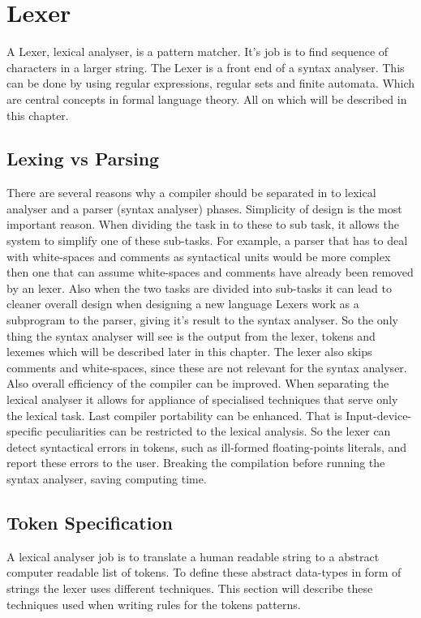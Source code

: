 \chapter{Lexer}
A Lexer, lexical analyser, is a pattern matcher. It's job is to find sequence 
of characters in a larger string. The Lexer is a front end of a syntax 
analyser. \cite{sebesta2012}
This can be done by using regular expressions, regular sets and finite
automata. Which are central concepts in formal language theory. \cite{Aho1990}
All on which will be described in this chapter.

\section{Lexing vs Parsing}
There are several reasons why a compiler should be separated in to lexical 
analyser and a parser (syntax analyser) phases. Simplicity of design is the most
important reason. When dividing the task in to these to sub task, it allows the
system to simplify one of these sub-tasks. For example, a parser that has to 
deal with white-spaces and comments as syntactical units would be more complex 
then one that can assume white-spaces and comments have already been removed by 
an lexer. Also when the two tasks are divided into sub-tasks it can lead to 
cleaner overall design when designing a new language \cite{Aho2006}
Lexers work as a subprogram to the parser, giving it's result to the syntax 
analyser. So the only thing the syntax analyser will see is the output from the 
lexer, tokens and lexemes which will be described later in this chapter. 
\cite{sebesta2012}
The lexer also skips comments and white-spaces, since these are not relevant 
for the syntax analyser. \cite{sebesta2012}
Also overall efficiency of the compiler can be improved. When separating the 
lexical analyser it allows for appliance of specialised techniques that serve 
only the lexical task. \cite{Aho2006}
Last compiler portability can be enhanced. That is Input-device-specific 
peculiarities can be restricted to the lexical analysis. \cite{Aho2006}
So the lexer can detect syntactical errors in tokens, such as ill-formed 
floating-points literals, and report these errors to the user. 
\cite{sebesta2012} Breaking the compilation before running the syntax analyser, 
saving computing time. 
\section{Token Specification}
A lexical analyser job is to translate a human readable string to a abstract 
computer readable list of tokens. To define these abstract data-types in form of
strings the lexer uses different techniques. This section will describe these
techniques used when writing rules for the tokens patterns. 
